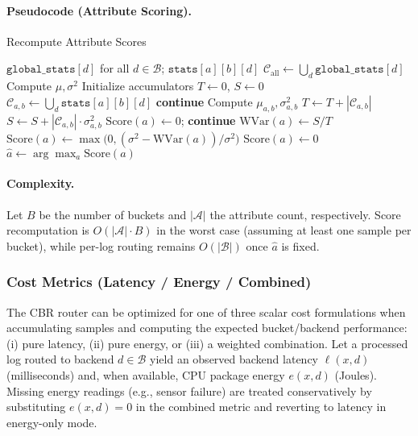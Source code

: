 \paragraph{Pseudocode (Attribute Scoring).}
\begin{algorithm}[H]
\caption{Recompute Attribute Scores}
\label{alg:cbr-score}
\begin{algorithmic}[1]
\Require $\texttt{global\_stats}[d]$ for all $d \in \mathcal{B}$; $\texttt{stats}[a][b][d]$
\State $\mathcal{C}_{\text{all}} \gets \bigcup_{d} \texttt{global\_stats}[d]$
 \Return
\EndIf
\State Compute $\mu, \sigma^2$
   \State Initialize accumulators $T \gets 0$, $S \gets 0$   
       \State $\mathcal{C}_{a,b} \gets \bigcup_{d} \texttt{stats}[a][b][d]$
        \textbf{continue}
       \EndIf
       \State Compute $\mu_{a,b}, \sigma_{a,b}^2$
       \State $T \gets T + |\mathcal{C}_{a,b}|$
       \State $S \gets S + |\mathcal{C}_{a,b}| \cdot \sigma_{a,b}^2$
   \EndFor
    \State $\mathrm{Score}(a) \gets 0$; \textbf{continue}
   \EndIf
   \State $\mathrm{WVar}(a) \gets S / T$
      \State $\mathrm{Score}(a) \gets \max\big(0, (\sigma^2 - \mathrm{WVar}(a)) / \sigma^2\big)$
   \Else
      \State $\mathrm{Score}(a) \gets 0$
   \EndIf
\EndFor
\State $\hat{a} \gets \arg\max_a \mathrm{Score}(a)$
\end{algorithmic}
\end{algorithm}

\paragraph{Complexity.}
Let $B$ be the number of buckets and $|\mathcal{A}|$ the attribute count, respectively. Score recomputation is $O(|\mathcal{A}| \cdot B)$ in the worst case (assuming at least one sample per bucket), while per-log routing remains $O(|\mathcal{B}|)$ once $\hat{a}$ is fixed.

\subsubsection{Cost Metrics (Latency / Energy / Combined)}
\label{subsubsec:cbr-cost}

The CBR router can be optimized for one of three scalar cost formulations when accumulating samples and computing the expected bucket/backend performance: (i) pure latency, (ii) pure energy, or (iii) a weighted combination. Let a processed log routed to backend $d \in \mathcal{B}$ yield an observed backend latency $\ell(x,d)$ (milliseconds) and, when available, CPU package energy $e(x,d)$ (Joules). Missing energy readings (e.g., sensor failure) are treated conservatively by substituting $e(x,d)=0$ in the combined metric and reverting to latency in energy-only mode.

